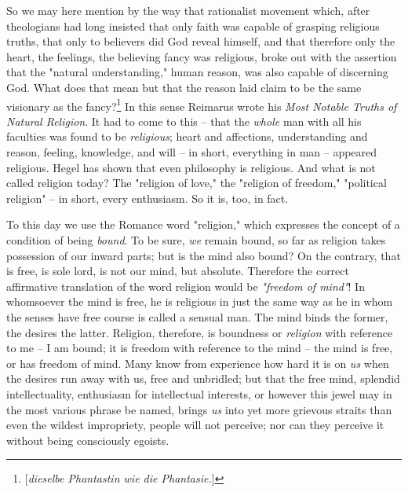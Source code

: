So we may here mention by the way that rationalist movement which, after 
theologians had long insisted that only faith was capable of grasping 
religious truths, that only to believers did God reveal himself, and that 
therefore only the heart, the feelings, the believing fancy was religious, 
broke out with the assertion that the "{}natural understanding,"{} human 
reason, was also capable of discerning God. What does that mean but that the 
reason laid claim to be the same visionary as the 
fancy?\footnote{[\textit{dieselbe Phantastin wie die Phantasie.}]} In this 
sense Reimarus wrote his \textit{Most Notable Truths of Natural Religion}. It 
had to come to this -- that the \textit{whole} man with all his faculties was 
found to be \textit{religious}; heart and affections, understanding and 
reason, feeling, knowledge, and will -- in short, everything in man -- 
appeared religious. Hegel has shown that even philosophy is religious. And 
what is not called religion today? The "{}religion of love,"{} the "{}religion 
of freedom,"{} "{}political religion"{} -- in short, every enthusiasm. So it 
is, too, in fact.

To this day we use the Romance word "{}religion,"{} which expresses the 
concept of a condition of being \textit{bound}. To be sure, \textit{we} remain 
bound, so far as religion takes possession of our inward parts; but is the 
mind also bound? On the contrary, that is free, is sole lord, is not our mind, 
but absolute. Therefore the correct affirmative translation of the word 
religion would be \textit{"{}freedom of mind"{}}! In whomsoever the mind is 
free, he is religious in just the same way as he in whom the senses have free 
course is called a sensual man. The mind binds the former, the desires the 
latter. Religion, therefore, is boundness or \textit{religion} with reference 
to me -- I am bound; it is freedom with reference to the mind -- the mind is 
free, or has freedom of mind. Many know from experience how hard it is on 
\textit{us} when the desires run away with us, free and unbridled; but that 
the free mind, splendid intellectuality, enthusiasm for intellectual 
interests, or however this jewel may in the most various phrase be named, 
brings \textit{us} into yet more grievous straits than even the wildest 
impropriety, people will not perceive; nor can they perceive it without being 
consciously egoists.

